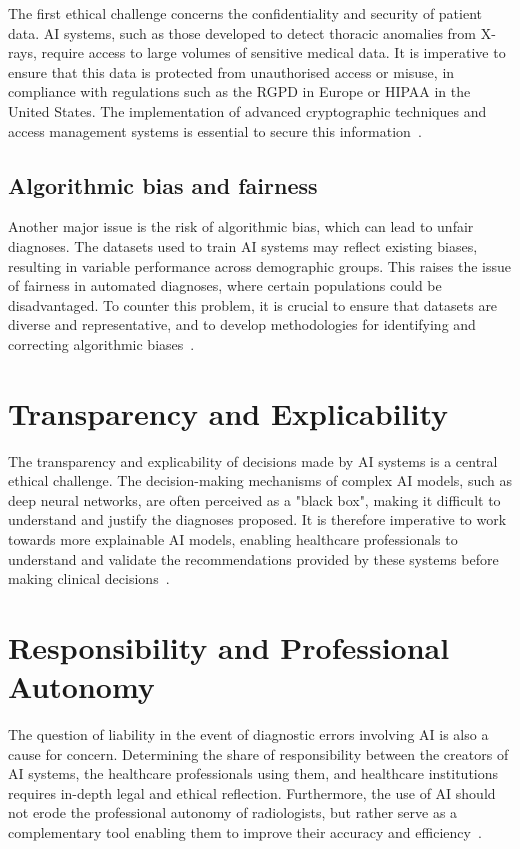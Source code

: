 \documentclass[12pt,oneside]{book} %
\begin{document}
The first ethical challenge concerns the confidentiality and security of
patient data. AI systems, such as those developed to detect thoracic anomalies
from X-rays, require access to large volumes of sensitive medical data. It is
imperative to ensure that this data is protected from unauthorised access or
misuse, in compliance with regulations such as the RGPD in Europe or HIPAA in
the United States. The implementation of advanced cryptographic techniques and
access management systems is essential to secure this
information~\cite{Murdoch2021}.

\subsection{Algorithmic bias and fairness}

Another major issue is the risk of algorithmic bias, which can lead to unfair
diagnoses. The datasets used to train AI systems may reflect existing biases,
resulting in variable performance across demographic groups. This raises the
issue of fairness in automated diagnoses, where certain populations could be
disadvantaged. To counter this problem, it is crucial to ensure that datasets
are diverse and representative, and to develop methodologies for identifying
and correcting algorithmic biases~\cite{Mittermaier2023}.

\section{Transparency and Explicability}

The transparency and explicability of decisions made by AI systems is a central
ethical challenge. The decision-making mechanisms of complex AI models, such as
deep neural networks, are often perceived as a "black box", making it difficult
to understand and justify the diagnoses proposed. It is therefore imperative to
work towards more explainable AI models, enabling healthcare professionals to
understand and validate the recommendations provided by these systems before
making clinical decisions~\cite{Amann2020}.

\section{Responsibility and Professional Autonomy}

The question of liability in the event of diagnostic errors involving AI is
also a cause for concern. Determining the share of responsibility between the
creators of AI systems, the healthcare professionals using them, and healthcare
institutions requires in-depth legal and ethical reflection. Furthermore, the
use of AI should not erode the professional autonomy of radiologists, but
rather serve as a complementary tool enabling them to improve their accuracy
and efficiency~\cite{Naik2022}.
\end{document}
